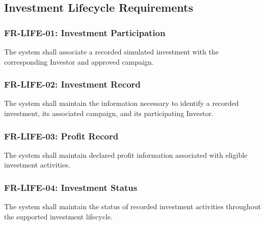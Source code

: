 
\subsection{Investment Lifecycle Requirements}

\subsubsection{FR-LIFE-01: Investment Participation}

The system shall associate a recorded simulated investment with the
corresponding Investor and approved campaign.

\subsubsection{FR-LIFE-02: Investment Record}

The system shall maintain the information necessary to identify a recorded
investment, its associated campaign, and its participating Investor.

\subsubsection{FR-LIFE-03: Profit Record}

The system shall maintain declared profit information associated with
eligible investment activities.

\subsubsection{FR-LIFE-04: Investment Status}

The system shall maintain the status of recorded investment activities
throughout the supported investment lifecycle.